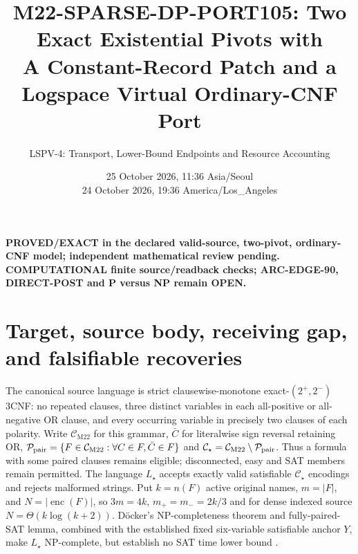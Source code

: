 \documentclass[11pt]{article}
\title{M22-SPARSE-DP-PORT105: Two Exact Existential Pivots with\\
A Constant-Record Patch and a Logspace Virtual Ordinary-CNF Port}
\author{LSPV-4: Transport, Lower-Bound Endpoints and Resource Accounting}
\date{25 October 2026, 11:36 Asia/Seoul\\
24 October 2026, 19:36 America/Los\_Angeles}
\newcommand{\CM}{\mathcal C_{\mathrm{M22}}}
\newcommand{\CS}{\mathcal C_\star}
\begin{document}
\maketitle
\begin{center}
\textbf{PROVED/EXACT in the declared valid-source, two-pivot, ordinary-CNF model; independent mathematical review pending.}\\
\textbf{COMPUTATIONAL finite source/readback checks; ARC-EDGE-90, DIRECT-POST and P versus NP remain OPEN.}
\end{center}

\section{Target, source body, receiving gap, and falsifiable recoveries}
The canonical source language is strict clausewise-monotone exact-$(2^+,2^-)$ 3CNF: no repeated clauses, three distinct variables in each all-positive or all-negative OR clause, and every occurring variable in precisely two clauses of each polarity. Write $\CM$ for this grammar,
$\bar C$ for literalwise sign reversal retaining OR,
$\mathcal P_{\rm pair}=\{F\in\CM:\forall C\in F,\bar C\in F\}$ and
$\CS=\CM\setminus\mathcal P_{\rm pair}$. Thus a formula with some paired clauses remains eligible; disconnected, easy and SAT members remain permitted. The language $L_\star$ accepts exactly valid satisfiable $\CS$ encodings and rejects malformed strings. Put $k=n(F)$ active original names, $m=|F|$, and $N=|\operatorname{enc}(F)|$, so $3m=4k$, $m_+=m_-=2k/3$ and for dense indexed source $N=\Theta(k\log(k+2))$. D\"ocker's NP-completeness theorem and fully-paired-SAT lemma, combined with the established fixed six-variable satisfiable anchor $Y$, make $L_\star$ NP-complete, but establish no SAT time lower bound \cite{docker}.
\end{document}
